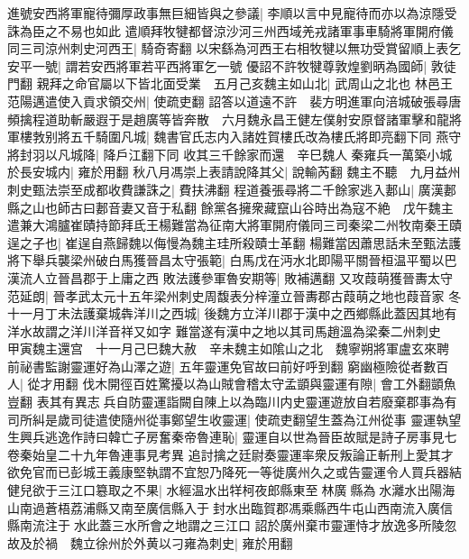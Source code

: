 進號安西將軍寵待彌厚政事無巨細皆與之參議|{
	李順以言中見寵待而亦以為涼隱受誅為臣之不易也如此}
遣順拜牧犍都督涼沙河三州西域羌戎諸軍事車騎將軍開府儀同三司涼州刺史河西王|{
	騎奇寄翻}
以宋繇為河西王右相牧犍以無功受賞留順上表乞安平一號|{
	謂若安西將軍若平西將軍乞一號}
優詔不許牧犍尊敦煌劉昞為國師|{
	敦徒門翻}
親拜之命官屬以下皆北面受業　五月己亥魏主如山北|{
	武周山之北也}
林邑王范陽邁遣使入貢求領交州|{
	使疏吏翻}
詔答以道遠不許　裴方明進軍向涪城破張尋唐頻擒程道助斬嚴遐于是趙廣等皆奔散　六月魏永昌王健左僕射安原督諸軍擊和龍將軍樓㪍别將五千騎圍凡城|{
	魏書官氏志内入諸姓賀樓氏改為樓氏將即亮翻下同}
燕守將封羽以凡城降|{
	降戶江翻下同}
收其三千餘家而還　辛巳魏人秦雍兵一萬築小城於長安城内|{
	雍於用翻}
秋八月馮崇上表請說降其父|{
	說輸芮翻}
魏主不聽　九月益州刺史甄法崇至成都收費謙誅之|{
	費扶沸翻}
程道養張尋將二千餘家逃入郪山|{
	廣漢郪縣之山也師古曰郪音妻又音于私翻}
餘黨各擁衆藏竄山谷時出為寇不絶　戊午魏主遣兼大鴻臚崔賾持節拜氐王楊難當為征南大將軍開府儀同三司秦梁二州牧南秦王賾逞之子也|{
	崔逞自燕歸魏以侮慢為魏主珪所殺賾士革翻}
楊難當因蕭思話未至甄法護將下舉兵襲梁州破白馬獲晉昌太守張範|{
	白馬戊在沔水北即陽平關晉桓温平蜀以巴漢流人立晉昌郡于上庸之西}
敗法護參軍魯安期等|{
	敗補邁翻}
又攻葭萌獲晉夀太守范延朗|{
	晉孝武太元十五年梁州刺史周馥表分梓潼立晉夀郡古葭萌之地也葭音家}
冬十一月丁未法護棄城犇洋川之西城|{
	後魏方立洋川郡于漢中之西鄉縣此蓋因其地有洋水故謂之洋川洋音祥又如字}
難當遂有漢中之地以其司馬趙溫為梁秦二州刺史　甲寅魏主還宫　十一月己巳魏大赦　辛未魏主如隂山之北　魏寧朔將軍盧玄來聘　前祕書監謝靈運好為山澤之遊|{
	五年靈運免官故曰前好呼到翻}
窮幽極險從者數百人|{
	從才用翻}
伐木開徑百姓驚擾以為山賊會稽太守孟顗與靈運有隙|{
	會工外翻顗魚豈翻}
表其有異志兵自防靈運詣闕自陳上以為臨川内史靈運遊放自若廢棄郡事為有司所糾是歲司徒遣使隨州從事鄭望生收靈運|{
	使疏吏翻望生蓋為江州從事}
靈運執望生興兵逃逸作詩曰韓亡子房奮秦帝魯連恥|{
	靈運自以世為晉臣故賦是詩子房事見七卷秦始皇二十九年魯連事見考異}
追討擒之廷尉奏靈運率衆反叛論正斬刑上愛其才欲免官而已彭城王義康堅執謂不宜恕乃降死一等徙廣州久之或告靈運令人買兵器結健兒欲于三江口簒取之不果|{
	水經温水出䍧柯夜郎縣東至林廣縣為水灕水出陽海山南過蒼梧荔浦縣又南至廣信縣入于封水出臨賀郡馮乘縣西牛屯山西南流入廣信縣南流注于水此蓋三水所會之地謂之三江口}
詔於廣州棄市靈運恃才放逸多所陵忽故及於禍　魏立徐州於外黄以刁雍為刺史|{
	雍於用翻}



